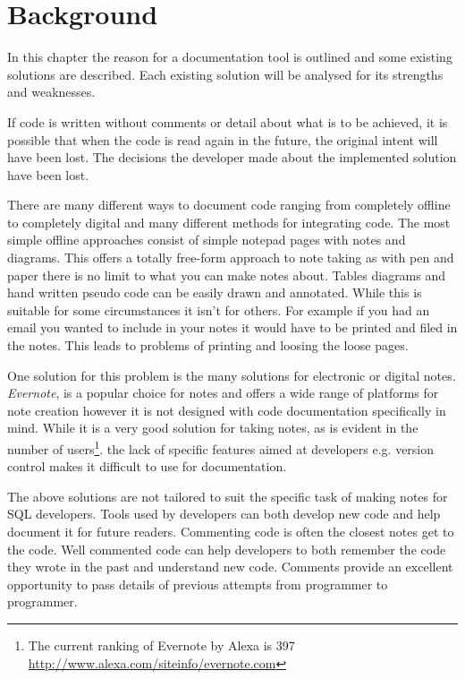 \chapter{Background}\label{background}

In this chapter the reason for a documentation tool is outlined and some
existing solutions are described. Each existing solution will be analysed for
its strengths and weaknesses.

If code is written without comments or detail about what is to be
achieved, it is possible that when the code is read again in the future, the
original intent will have been lost. The decisions the developer made about the implemented
solution have been lost.

There are many different ways to document code ranging from
completely offline to completely digital and many different methods for
integrating code. The most simple offline approaches consist of simple
notepad pages with notes and diagrams. This offers a totally free-form
approach to note taking as with pen and paper there is no limit to what
you can make notes about. Tables diagrams and hand written pseudo code
can be easily drawn and annotated. While this is suitable for some
circumstances it isn't for others. For example if you had an email you wanted
to include in your notes it would have to be printed and filed in the notes.
This leads to problems of printing and loosing the loose pages.

One solution for this problem is the many solutions for electronic or digital
notes. \textit{Evernote}\cite{evernote}, is a popular choice for notes and offers
a wide range of platforms for note creation however it is not designed with code
documentation specifically in mind. While it is a very good solution for taking
notes, as is evident in the number of users\footnote{The current ranking of
Evernote by Alexa is 397
\href{http://www.alexa.com/siteinfo/evernote.com}{http://www.alexa.com/siteinfo/evernote.com}}.
the lack of specific features aimed at developers e.g. version control makes it
difficult to use for documentation.

The above solutions are not tailored to suit the specific task of making notes
for SQL developers. Tools used by developers can both develop new code and help
document it for future readers. Commenting code is often the closest notes get
to the code. Well commented code can help developers to both remember the code
they wrote in the past and understand new code. Comments provide an excellent
opportunity to pass details of previous attempts from programmer to programmer.

